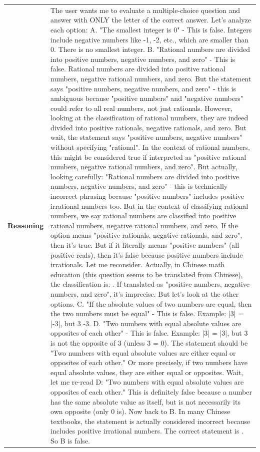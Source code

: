 \begin{longtable}{@{}l p{13cm}@{}}
  \textbf{Reasoning} & The user wants me to evaluate a multiple-choice question and answer with ONLY the letter of the correct answer. \newline Let's analyze each option: \newline A. "The smallest integer is 0" - This is false. Integers include negative numbers like -1, -2, etc., which are smaller than 0. There is no smallest integer. \newline B. "Rational numbers are divided into positive numbers, negative numbers, and zero" - This is false. Rational numbers are divided into positive rational numbers, negative rational numbers, and zero. But the statement says "positive numbers, negative numbers, and zero" - this is ambiguous because "positive numbers" and "negative numbers" could refer to all real numbers, not just rationals. However, looking at the classification of rational numbers, they are indeed divided into positive rationals, negative rationals, and zero. But wait, the statement says "positive numbers, negative numbers" without specifying "rational". In the context of rational numbers, this might be considered true if interpreted as "positive rational numbers, negative rational numbers, and zero". But actually, looking carefully: "Rational numbers are divided into positive numbers, negative numbers, and zero" - this is technically incorrect phrasing because "positive numbers" includes positive irrational numbers too. But in the context of classifying rational numbers, we say rational numbers are classified into positive rational numbers, negative rational numbers, and zero. If the option means "positive rationals, negative rationals, and zero", then it's true. But if it literally means "positive numbers" (all positive reals), then it's false because positive numbers include irrationals. Let me reconsider. \newline Actually, in Chinese math education (this question seems to be translated from Chinese), the classification is: . If translated as "positive numbers, negative numbers, and zero", it's imprecise. But let's look at the other options. \newline C. "If the absolute values of two numbers are equal, then the two numbers must be equal" - This is false. Example: |3| = |-3|, but 3 -3. \newline D. "Two numbers with equal absolute values are opposites of each other" - This is false. Example: |3| = |3|, but 3 is not the opposite of 3 (unless 3 = 0). The statement should be "Two numbers with equal absolute values are either equal or opposites of each other." Or more precisely, if two numbers have equal absolute values, they are either equal or opposites. \newline Wait, let me re-read D: "Two numbers with equal absolute values are opposites of each other." This is definitely false because a number has the same absolute value as itself, but is not necessarily its own opposite (only 0 is). \newline Now back to B. In many Chinese textbooks, the statement is actually considered incorrect because includes positive irrational numbers. The correct statement is . So B is false. \newline 
\end{longtable}
